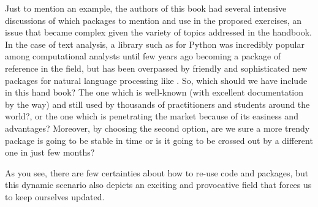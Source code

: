Just to mention an example, the authors of this book had several intensive discussions of which packages to mention and use in the proposed exercises, an issue that became complex given the variety of topics addressed in the handbook. In the case of text analysis, a library such as  for Python was incredibly popular among computational analysts until few years ago becoming a package of reference in the field, but has been overpassed by friendly and sophisticated new packages for natural language processing like . So, which should we have include in this hand book? The one which is well-known (with excellent documentation by the way) and still used by thousands of practitioners and students around the world?, or the one which is penetrating the market because of its easiness and advantages? Moreover, by choosing the second option, are we sure a more trendy package is going to be stable in time or is it going to be crossed out by a different one in just few months?  

As you see, there are few certainties about how to re-use code and packages, but this dynamic scenario also depicts an exciting and provocative field that forces us to keep ourselves updated.